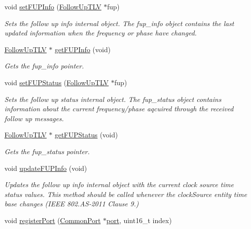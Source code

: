 \begin{DoxyCompactItemize}
void \hyperlink{class_i_e_e_e1588_clock_a6e64e862cbab7bc3f6d4313873c829c2}{set\+F\+U\+P\+Info} (\hyperlink{class_follow_up_t_l_v}{Follow\+Up\+T\+LV} $\ast$fup)
\begin{DoxyCompactList}\small\item\em Sets the follow up info internal object. The fup\+\_\+info object contains the last updated information when the frequency or phase have changed. \end{DoxyCompactList}\item 
\hyperlink{class_follow_up_t_l_v}{Follow\+Up\+T\+LV} $\ast$ \hyperlink{class_i_e_e_e1588_clock_abfaa518042e608988d3bfeae73e171b4}{get\+F\+U\+P\+Info} (void)
\begin{DoxyCompactList}\small\item\em Gets the fup\+\_\+info pointer. \end{DoxyCompactList}\item 
void \hyperlink{class_i_e_e_e1588_clock_a3ef8e00463d8e3e6d55ca3e2028e1524}{set\+F\+U\+P\+Status} (\hyperlink{class_follow_up_t_l_v}{Follow\+Up\+T\+LV} $\ast$fup)
\begin{DoxyCompactList}\small\item\em Sets the follow up status internal object. The fup\+\_\+status object contains information about the current frequency/phase aqcuired through the received follow up messages. \end{DoxyCompactList}\item 
\hyperlink{class_follow_up_t_l_v}{Follow\+Up\+T\+LV} $\ast$ \hyperlink{class_i_e_e_e1588_clock_a0f9e3da79c0433d8ddeb984875c145c6}{get\+F\+U\+P\+Status} (void)
\begin{DoxyCompactList}\small\item\em Gets the fup\+\_\+status pointer. \end{DoxyCompactList}\item 
void \hyperlink{class_i_e_e_e1588_clock_aa41be6e57b021a11d16990ba72a69188}{update\+F\+U\+P\+Info} (void)
\begin{DoxyCompactList}\small\item\em Updates the follow up info internal object with the current clock source time status values. This method should be called whenever the clock\+Source entity time base changes (I\+E\+EE 802.\+AS-\/2011 Clause 9.) \end{DoxyCompactList}\item 
void \hyperlink{class_i_e_e_e1588_clock_a5cf27204b7e430123f2c711c2fcdc8e4}{register\+Port} (\hyperlink{class_common_port}{Common\+Port} $\ast$\hyperlink{gst__avb__playbin_8c_a63c89c04d1feae07ca35558055155ffb}{port}, uint16\+\_\+t index)

\end{DoxyCompactItemize}
